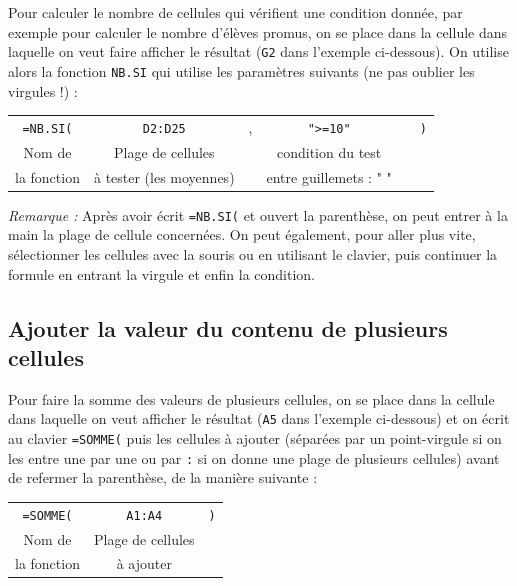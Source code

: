 Pour calculer le nombre de cellules qui vérifient une condition donnée, par exemple pour calculer le nombre d'élèves promus, on se place dans la cellule dans laquelle on veut faire afficher le résultat (\texttt{G2} dans l'exemple ci-dessous). On utilise alors la fonction \texttt{NB.SI} qui utilise les paramètres suivants (ne pas oublier les virgules !) :


\begin{center}
\begin{tabular}{cccccc}
\texttt{=NB.SI(} & \texttt{D2:D25} & , & \texttt{">=10"} &  &  \texttt{)} \\  
Nom de & Plage de cellules  & & condition du test &  & \\
la fonction & à tester (les moyennes) & &  entre guillemets : " " & & \\  
\end{tabular}
\end{center}



\emph{Remarque :} Après avoir écrit \texttt{=NB.SI(} et ouvert la parenthèse, on peut entrer à la main la plage de cellule concernées. On peut également, pour aller plus vite, sélectionner les cellules avec la souris ou en utilisant le clavier, puis continuer la formule en entrant la virgule et enfin la condition.



\subsection{Ajouter la valeur du contenu de plusieurs cellules}\label{Calc3Somme}

Pour faire la somme des valeurs de plusieurs cellules, on se place dans la cellule dans laquelle on veut afficher le résultat (\texttt{A5} dans l'exemple ci-dessous) et on écrit au clavier \texttt{=SOMME(} puis les cellules à ajouter (séparées par un point-virgule si on les entre une par une ou par \texttt{:} si on donne une plage de plusieurs cellules) avant de refermer la parenthèse, de la manière suivante :

\begin{center}
\begin{tabular}{ccc}
\texttt{=SOMME(} & \texttt{A1:A4} &   \texttt{)} \\  
Nom de & Plage de cellules  & \\
la fonction & à ajouter & \\  
\end{tabular}
\end{center}

